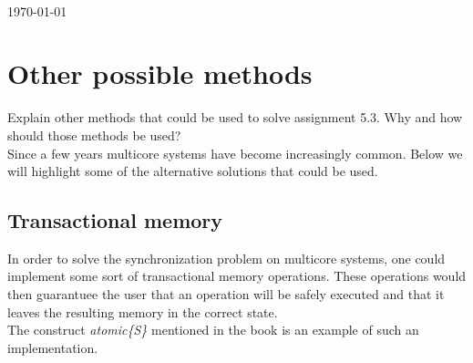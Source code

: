 \documentclass[12pt]{article}
\begin{document}
\begin{titlepage}
\begin{minipage}{0.4\textwidth}
\begin{flushright}
\end{flushright}
\end{minipage}\\[3cm]



{\large \today}\\[3cm] %


 

\vfill %

\end{titlepage}

\section*{Other possible methods}
Explain other methods that could be used to solve assignment 5.3. Why and how should those methods be used? \\

Since a few years multicore systems have become increasingly common.
Below we will highlight some of the alternative solutions that could be used.
\subsection*{Transactional memory}
In order to solve the synchronization problem on multicore systems, one could implement some sort
of transactional memory operations.
These operations would then guarantuee the user that an operation will be safely executed and that it leaves the resulting memory in the correct state. \\
The construct \textit{atomic\{S\}} mentioned in the book is an example of such an implementation.
\end{document}
